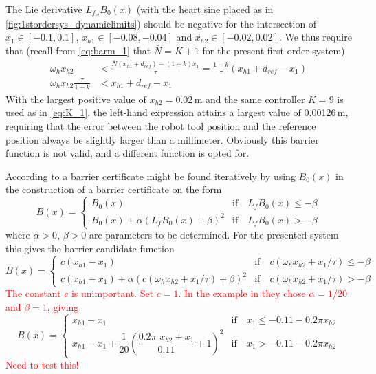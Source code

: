 The Lie derivative $L_{f_{cl}}B_0(x)$ (with the heart sine placed as in \autoref{fig:1stordersys_dynamiclimits}) should be negative for the intersection of  $x_1\in[-0.1,0.1]$, $x_{h1}\in [-0.08,-0.04]$ and $x_{h2}\in [-0.02,0.02]$. We thus require that (recall from \autoref{eq:barm_1} that $\bar{N}=K+1$ for the present first order system)
\begin{align}
\omega_h x_{h2} &< \frac{\bar{N}(x_{h1} + d_{ref})-(1+k) x_1}{\tau} = \frac{1+k}{\tau}(x_{h1} + d_{ref}-x_1)\nonumber\\
\omega_h x_{h2} \frac{\tau}{1+k} &< x_{h1} + d_{ref}-x_1
\end{align}
With the largest positive value of $x_{h2}=0.02$\,m and the same controller $K=9$ is used as in \autoref{eq:K_1}, the left-hand expression attains a largest value of 0.00126\,m, requiring that the error between the robot tool position and the reference position always be slightly larger than a millimeter. 
Obviously this barrier function is not valid, and a different function is opted for.

According to \cite{bib:org_control} a barrier certificate might be found iteratively by using $B_0(x)$ in the construction of a barrier certificate on the form
\begin{equation}
B(x) = 
\begin{cases}
B_0(x) & \text{if}\quad L_fB_0(x) \leq -\beta\\
B_0(x)+\alpha(L_fB_0(x)+\beta)^2 & \text{if}\quad L_fB_0(x)>-\beta 
\end{cases}
\end{equation}
where $\alpha>0$, $\beta>0$ are parameters to be determined. For the presented system this gives the barrier candidate function 
\begin{equation}
B(x) = 
\begin{cases}
c(x_{h1}-x_1) & \text{if}\quad c\left(\omega_h x_{h2} +  x_1/\tau\right) \leq -\beta\\
c(x_{h1}-x_1)+\alpha(c\left(\omega_h x_{h2} +  x_1/\tau\right)+\beta)^2 & \text{if}\quad c\left(\omega_h x_{h2} +  x_1/\tau\right)>-\beta 
\end{cases}
\end{equation}
\textcolor{red}{The constant $c$ is unimportant. Set $c=1$.  In the example in \citep{bib:org_control} they chose $\alpha=1/20$ and $\beta=1$, giving}
\begin{equation}
B(x) = 
\begin{cases}
x_{h1}-x_1 & \text{if}\quad x_1 \leq -0.11-0.2\pi x_{h2}\\
x_{h1}-x_1+\dfrac{1}{20}\left(\dfrac{0.2\pi\,\, x_{h2} +   x_1}{0.11}+1\right)^2 & \text{if}\quad x_1 > -0.11-0.2\pi x_{h2} 
\end{cases}
\end{equation}
\textcolor{red}{Need to test this!}


